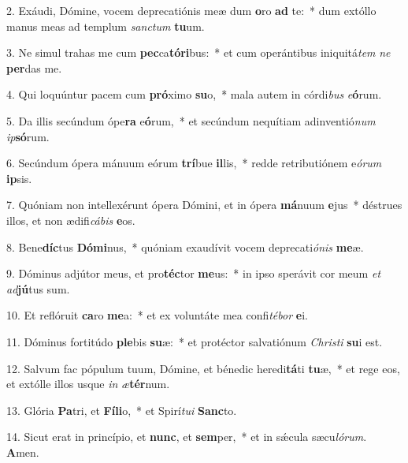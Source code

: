 2. Exáudi, Dómine, vocem deprecatiónis meæ dum \textbf{o}ro \textbf{ad} te:~*  dum extóllo manus meas ad templum \textit{sanc}\textit{tum} \textbf{tu}um.\

3. Ne simul trahas me cum \textbf{pec}ca\textbf{tó}\textbf{ri}bus:~*  et cum operántibus iniquitá\textit{tem} \textit{ne} \textbf{per}das me.\

4. Qui loquúntur pacem cum \textbf{pró}ximo \textbf{su}o,~*  mala autem in córdi\textit{bus} \textit{e}\textbf{ó}rum.\

5. Da illis secúndum ópe\textbf{ra} e\textbf{ó}rum,~*  et secúndum nequítiam adinventió\textit{num} \textit{ip}\textbf{só}rum.\

6. Secúndum ópera mánuum eórum \textbf{trí}bue \textbf{il}lis,~*  redde retributiónem e\textit{ó}\textit{rum} \textbf{ip}sis.\

7. Quóniam non intellexérunt ópera Dómini, et in ópera \textbf{má}nuum \textbf{e}jus~*  déstrues illos, et non ædifi\textit{cá}\textit{bis} \textbf{e}os.\

8. Bene\textbf{díc}tus \textbf{Dó}\textbf{mi}nus,~*  quóniam exaudívit vocem deprecati\textit{ó}\textit{nis} \textbf{me}æ.\

9. Dóminus adjútor meus, et pro\textbf{téc}tor \textbf{me}us:~*  in ipso sperávit cor meum \textit{et} \textit{ad}\textbf{jú}tus sum.\

10. Et reflóruit \textbf{ca}ro \textbf{me}a:~*  et ex voluntáte mea confi\textit{té}\textit{bor} \textbf{e}i.\

11. Dóminus fortitúdo \textbf{ple}bis \textbf{su}æ:~*  et protéctor salvatiónum \textit{Chris}\textit{ti} \textbf{su}i est.\

12. Salvum fac pópulum tuum, Dómine, et bénedic heredi\textbf{tá}ti \textbf{tu}æ,~*  et rege eos, et extólle illos usque \textit{in} \textit{æ}\textbf{tér}num.\

13. Glória \textbf{Pa}tri, et \textbf{Fí}\textbf{li}o,~*  et Spirí\textit{tu}\textit{i} \textbf{Sanc}to.\

14. Sicut erat in princípio, et \textbf{nunc}, et \textbf{sem}per,~*  et in sǽcula sæcu\textit{ló}\textit{rum}. \textbf{A}men.\

